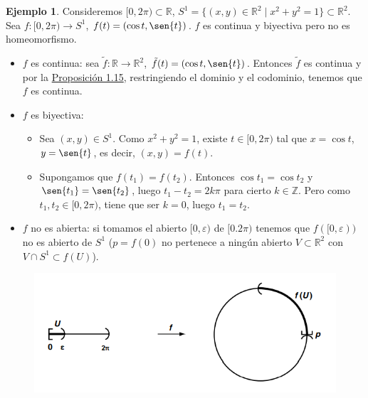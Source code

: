 \documentclass[12pt]{report}
\theoremstyle{definition}
\theoremstyle{definition}
\newtheorem{example}{Ejemplo}[chapter]
\theoremstyle{remark}
\newcommand{\R}{\mathbb R}
\newcommand{\Z}{\mathbb Z}
\begin{document}
\begin{example}
Consideremos $[0,2\pi) \subset \R$, $S^1 = \{(x,y) \in \R^2 \mid x^2 + y^2 = 1\} \subset \R^2$. Sea $f \colon [0,2\pi) \to S^1$, $f(t) = (\cos{t},\sen{t})$. $f$ es continua y biyectiva pero no es homeomorfismo.
\begin{itemize}
    \item $f$ es continua: sea $\tilde{f} \colon \R \to \R^2$, $\tilde{f}(t) = (\cos{t},\sen{t})$. Entonces $\tilde{f}$ es continua y por la \hyperref[prop1.15.]{\color{blue}Proposición 1.15}, restringiendo el dominio y el codominio, tenemos que $f$ es continua.
    \item $f$ es biyectiva:
    \begin{itemize}
        \item Sea $(x,y) \in S^1$. Como $x^2 + y^2 = 1$, existe $t \in [0,2\pi)$ tal que $x = \cos{t}$, $y = \sen{t}$, es decir, $(x,y) = f(t)$.
        \item Supongamos que $f(t_1) = f(t_2)$. Entonces $\cos{t_1} = \cos{t_2}$ y $\sen{t_1} = \sen{t_2}$, luego $t_1 - t_2 = 2k\pi$ para cierto $k \in \Z$. Pero como $t_1,t_2 \in [0,2\pi)$, tiene que ser $k = 0$, luego $t_1 = t_2$.
    \end{itemize}
    \item $f$ no es abierta: si tomamos el abierto $[0,\varepsilon)$ de $[0.2\pi)$ tenemos que $f([0,\varepsilon))$ no es abierto de $S^1$ ($p = f(0)$ no pertenece a ningún abierto $V \subset \R^2$ con $V \cap S^1 \subset f(U)$).
\end{itemize}
\begin{figure}[h]
\includegraphics[scale = 0.6]{ex1.22}
\centering
\end{figure}
\end{example}
\end{document}
